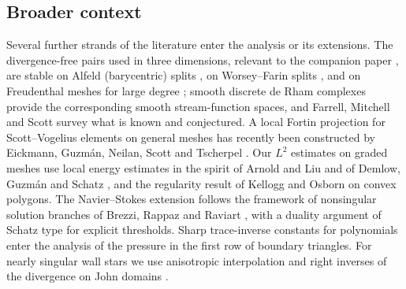 \subsection{Broader context}
Several further strands of the literature enter the analysis or its extensions. The divergence-free pairs used in three dimensions, relevant to the companion paper \cite{PadhiThreeD}, are stable on Alfeld (barycentric) splits \cite{Zhang2005,GuzmanNeilan2018}, on Worsey--Farin splits \cite{GuzmanLischkeNeilan2022}, and on Freudenthal meshes for large degree \cite{Zhang2011}; smooth discrete de Rham complexes \cite{Neilan2015,FuGuzmanNeilan2020} provide the corresponding smooth stream-function spaces, and Farrell, Mitchell and Scott \cite{FarrellMitchellScott2024} survey what is known and conjectured. A local Fortin projection for Scott--Vogelius elements on general meshes has recently been constructed by Eickmann, Guzm\'an, Neilan, Scott and Tscherpel \cite{EickmannGNST2026}. Our $L^2$ estimates on graded meshes use local energy estimates in the spirit of Arnold and Liu \cite{ArnoldLiu1995} and of Demlow, Guzm\'an and Schatz \cite{DemlowGuzmanSchatz2011}, and the regularity result of Kellogg and Osborn \cite{KelloggOsborn1976} on convex polygons. The Navier--Stokes extension follows the framework of nonsingular solution branches of Brezzi, Rappaz and Raviart \cite{BRR1980,GiraultRaviart}, with a duality argument of Schatz type \cite{Schatz1974} for explicit thresholds. Sharp trace-inverse constants for polynomials \cite{WarburtonHesthaven2003} enter the analysis of the pressure in the first row of boundary triangles. For nearly singular wall stars we use anisotropic interpolation \cite{BabuskaAziz1976,Apel1999} and right inverses of the divergence on John domains \cite{AcostaDuranMuschietti2006}.

